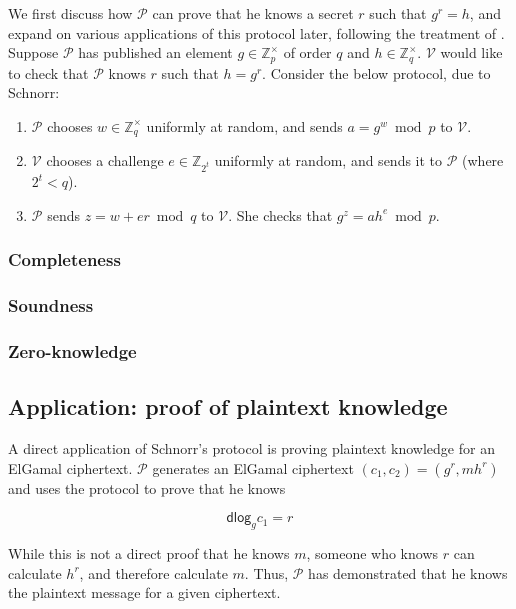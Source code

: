 \documentclass[12pt,a4paper]{article}
\newcommand{\dlog}{\mathsf{dlog}}
\theoremstyle{definition}
\newcounter{protocol}
\begin{document}
We first discuss how $\mathcal{P}$ can prove that he knows a secret $r$ such that $g^r=h$, and expand on various applications of this protocol later, following the treatment of \cite{damgaard2002sigma}. Suppose $\mathcal{P}$ has published an element $g\in\mathbb{Z}^\times_p$ of order $q$ and $h\in\mathbb{Z}^\times_q$. $\mathcal{V}$ would like to check that $\mathcal{P}$ knows $r$ such that $h=g^r$. Consider the below protocol, due to Schnorr:
\begin{enumerate}
    \item $\mathcal{P}$ chooses $w\in\mathbb{Z}^\times_q$ uniformly at random, and sends $a=g^w\bmod p$ to $\mathcal{V}$.
    \item $\mathcal{V}$ chooses a challenge $e\in\mathbb{Z}_{2^t}$ uniformly at random, and sends it to $\mathcal{P}$ (where $2^t<q$).
    \item $\mathcal{P}$ sends $z=w+er\bmod q$ to $\mathcal{V}$. She checks that $g^z=ah^e\bmod p$.
\end{enumerate}
\subsubsection{Completeness}
\subsubsection{Soundness}
\subsubsection{Zero-knowledge}
\subsection{Application: proof of plaintext knowledge}
A direct application of Schnorr's protocol is proving plaintext knowledge for an ElGamal ciphertext. $\mathcal{P}$ generates an ElGamal ciphertext $(c_1, c_2)=(g^r, mh^r)$ and uses the protocol to prove that he knows

$$\dlog_g{c_1}=r$$

While this is not a direct proof that he knows $m$, someone who knows $r$ can calculate $h^r$, and therefore calculate $m$. Thus, $\mathcal{P}$ has demonstrated that he knows the plaintext message for a given ciphertext.
\end{document}
